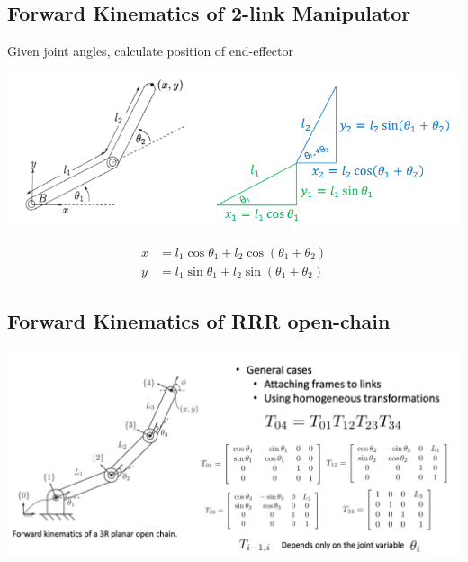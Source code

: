 \documentclass[10pt]{article}
\begin{document}
\subsection*{Forward Kinematics of 2-link Manipulator}
Given joint angles, calculate position of end-effector
\begin{center} 
	\includegraphics*[width=\textwidth]{L1_16.png} 
\end{center}

\begin{align*}
    x &= l_1 \cos \theta_1 + l_2 \cos(\theta_1 + \theta_2)\\
    y &= l_1 \sin \theta_1 + l_2 \sin(\theta_1 + \theta_2)
\end{align*}

\subsection*{Forward Kinematics of RRR open-chain}
\begin{center} 
	\includegraphics*[width=\textwidth]{L1_17.png} 
\end{center}
\end{document}
